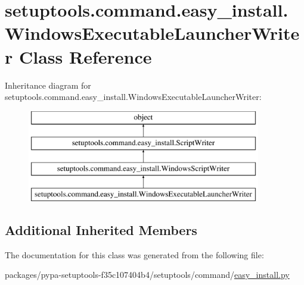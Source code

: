 \hypertarget{classsetuptools_1_1command_1_1easy__install_1_1WindowsExecutableLauncherWriter}{}\section{setuptools.\+command.\+easy\+\_\+install.\+Windows\+Executable\+Launcher\+Writer Class Reference}
\label{classsetuptools_1_1command_1_1easy__install_1_1WindowsExecutableLauncherWriter}
Inheritance diagram for setuptools.\+command.\+easy\+\_\+install.\+Windows\+Executable\+Launcher\+Writer\+:\begin{figure}[H]
\begin{center}
\leavevmode
\includegraphics[height=4.000000cm]{classsetuptools_1_1command_1_1easy__install_1_1WindowsExecutableLauncherWriter}
\end{center}
\end{figure}
\subsection*{Additional Inherited Members}


The documentation for this class was generated from the following file\+:\begin{DoxyCompactItemize}
\item 
packages/pypa-\/setuptools-\/f35c107404b4/setuptools/command/\hyperlink{setuptools_2command_2easy__install_8py}{easy\+\_\+install.\+py}\end{DoxyCompactItemize}
